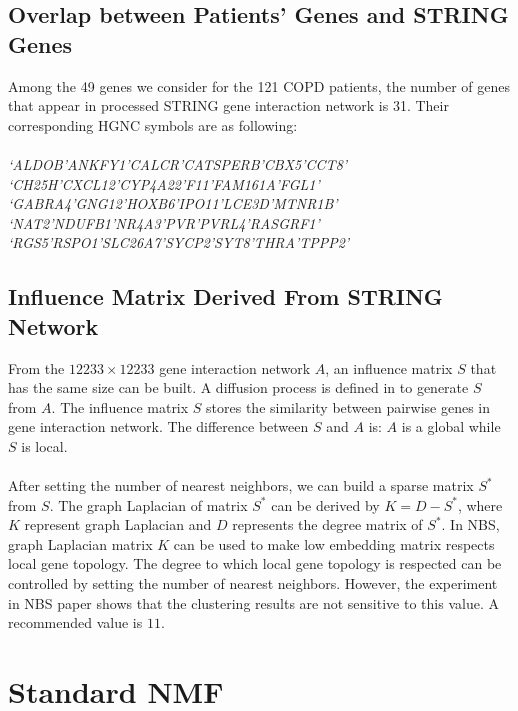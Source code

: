 \documentclass[11pt]{article}
\newcommand{\tab}[1]{\hspace{.05\textwidth}\rlap{#1}}
\begin{document}
\subsection{Overlap between Patients' Genes and STRING Genes}
Among the 49 genes we consider for the 121 COPD patients, the number of genes that appear in processed STRING gene interaction network is 31. Their corresponding HGNC symbols are as following:\\
\\
\textit{`ALDOB'\tab `ANKFY1'\tab `CALCR'\tab `CATSPERB'\tab `CBX5'\tab `CCT8'\tab \\
`CH25H'\tab `CXCL12'\tab `CYP4A22'\tab `F11'\tab `FAM161A'\tab `FGL1'\tab \\
`GABRA4'\tab `GNG12'\tab `HOXB6'\tab `IPO11'\tab `LCE3D'\tab `MTNR1B'\tab \\
`NAT2'\tab `NDUFB1'\tab `NR4A3'\tab `PVR'\tab `PVRL4'\tab `RASGRF1'\tab \\
`RGS5'\tab `RSPO1'\tab `SLC26A7'\tab `SYCP2'\tab `SYT8'\tab `THRA'\tab `TPPP2'}

\subsection{Influence Matrix Derived From STRING Network}
From the $12233\times 12233$ gene interaction network $A$, an influence matrix $S$ that has the same size can be built\cite{nbs_code}. A diffusion process is defined in \cite{influence} to generate $S$ from $A$. The influence matrix $S$ stores the similarity between pairwise genes in gene interaction network. The difference between $S$ and $A$ is: $A$ is a global while $S$ is local.\\
\\
After setting the number of nearest neighbors, we can build a sparse matrix $S^*$ from $S$. The graph Laplacian of matrix $S^*$ can be derived by $K=D-S^*$, where $K$ represent graph Laplacian and $D$ represents the degree matrix of $S^*$. In NBS, graph Laplacian matrix $K$ can be used to make low embedding matrix respects local gene topology. The degree to which local gene topology is respected can be controlled by setting the number of nearest neighbors. However, the experiment in NBS paper shows that the clustering results are not sensitive to this value. A recommended value is $11$.

\section{Standard NMF}
\end{document}

